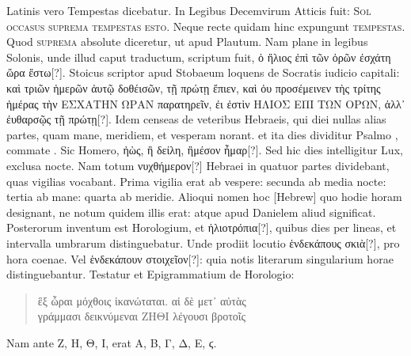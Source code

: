 Latinis
vero Tempestas dicebatur.
In Legibus Decemvirum Atticis fuit:
\textsc{Sol occasus suprema tempestas esto}.
Neque recte
quidam hinc expungunt \textsc{tempestas}.
Quod \textsc{suprema} absolute
diceretur, ut apud Plautum.
Nam plane in legibus Solonis, unde illud
caput traductum, scriptum fuit,
 \textgreek{ὁ ἥλιος ἐπὶ τῶν ὀρῶν ἐσχάτη ὥρα ἔστω[?]}.
Stoicus
scriptor apud Stobaeum loquens de Socratis iudicio capitali: 
\textgreek{καὶ
τριῶν ἡμερῶν ἀυτῷ δοθέισῶν, τῇ πρώτῃ ἔπιεν,
 καὶ ὀυ προσέμεινεν τὴς τρίτης ἡμέρας τὴν
ΕΣΧΑΤΗΝ ΩΡΑΝ παρατηρεῖν, ἐι ἐστὶν ΗΛΙΟΣ ΕΠΙ ΤΩΝ
ΟΡΩΝ, ἀλλ᾽ ἐυθαρσῷς τῇ πρώτῃ[?]}.
Idem censeas de veteribus Hebraeis,
qui diei nullas alias partes, quam mane, meridiem, et vesperam norant.
et ita dies dividitur Psalmo , commate .
%
Sic Homero,
\textgreek{ἠὼς, ἢ δείλη, ἢμέσον ἦμαρ[?]}.
Sed hic dies intelligitur Lux, exclusa nocte.
Nam totum \textgreek{νυχθήμερον[?]} Hebraei in quatuor partes
 dividebant, quas vigilias
vocabant.
Prima vigilia erat ab vespere: secunda ab media nocte:
tertia ab mane: quarta ab meridie.
Alioqui nomen hoc \texthebrew{}[Hebrew] quo hodie
horam designant, ne notum quidem illis erat: atque apud Danielem
aliud significat.
Posterorum inventum est Horologium, et \textgreek{ἡλιοτρόπια[?]},
quibus dies per lineas, et intervalla umbrarum distinguebatur.
Unde prodiit locutio \textgreek{ἑνδεκάπους σκιὰ[?]}, pro hora coenae.
Vel \textgreek{ἑνδεκάπουν στοιχεῖον[?]}:
quia notis literarum singularium horae distinguebantur.
Testatur et Epigrammatium de Horologio:
\begin{verse}
\textgreek{ἓξ ὧραι μόχθοις ἱκανώταται. αἱ δὲ μετ᾽ αὐτὰς}\\
\textgreek{γράμμασι δεικνύμεναι ΖΗΘΙ λέγουσι βροτοῖς}
\end{verse}
%
\begin{table}[p]
  
\end{table}
%
Nam ante
\textgreek{Ζ, Η, Θ, Ι,} erat \textgreek{Α, Β, Γ, Δ, Ε, ϛ.}
